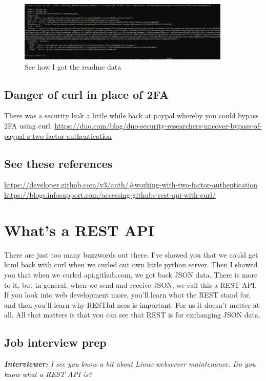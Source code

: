 \documentclass[10pt]{article}
\begin{document}
\begin{figure}[h]
  \centering
    \includegraphics[width=0.9\textwidth]{getReadme.PNG}
  \caption{See how I got the readme data}
\end{figure}

\subsection{Danger of curl in place of 2FA}
There was a security leak a little while back at paypal whereby you could bypass 2FA using curl.
\url{https://duo.com/blog/duo-security-researchers-uncover-bypass-of-paypal-s-two-factor-authentication}

\subsection{See these references}
\url{https://developer.github.com/v3/auth/#working-with-two-factor-authentication}
\url{https://blogs.infosupport.com/accessing-githubs-rest-api-with-curl/}

\section{What's a REST API}
There are just too many buzzwords out there. I've showed you that we could get html back with curl when we curled out own little python server. Then I showed you that when we curled api.github.com, we got back JSON data. There is more to it, but in general, when we send and receive JSON, we call this a REST API. If you look into web development more, you'll  learn what the REST stand for, and then you'll learn why RESTful ness is important. For us it doesn't matter at all. All that matters is that you can see that REST is for exchanging JSON data.

\subsection{Job interview prep}
\noindent\textit{\textbf{Interviewer:} I see you know a bit about Linux webserver maintenance. Do you know what a REST API is?}
\end{document}
